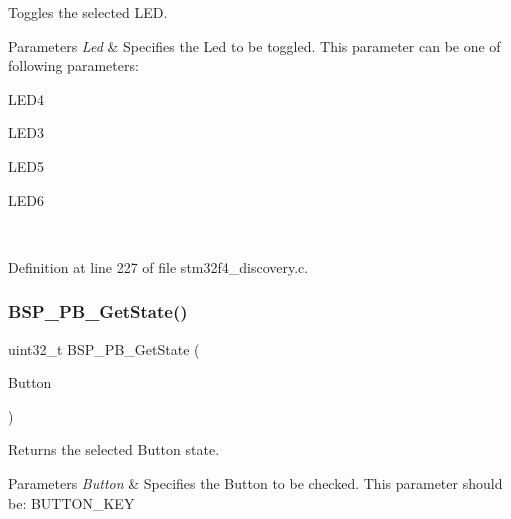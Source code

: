 Toggles the selected L\+ED. 


\begin{DoxyParams}{Parameters}
{\em Led} & Specifies the Led to be toggled. This parameter can be one of following parameters\+: \begin{DoxyItemize}
\item L\+E\+D4 \item L\+E\+D3 \item L\+E\+D5 \item L\+E\+D6 \end{DoxyItemize}
\\
\hline
\end{DoxyParams}


Definition at line 227 of file stm32f4\+\_\+discovery.\+c.

\mbox{\label{group___s_t_m32_f4___d_i_s_c_o_v_e_r_y___l_o_w___l_e_v_e_l___exported___functions_ga8f0978b6cffda9c67266ddfdb3a0abf7}} 
\subsubsection{\texorpdfstring{B\+S\+P\+\_\+\+P\+B\+\_\+\+Get\+State()}{BSP\_PB\_GetState()}}
{\footnotesize\ttfamily uint32\+\_\+t B\+S\+P\+\_\+\+P\+B\+\_\+\+Get\+State (\begin{DoxyParamCaption}\item[{Button\+\_\+\+Type\+Def}]{Button }\end{DoxyParamCaption})}



Returns the selected Button state. 


\begin{DoxyParams}{Parameters}
{\em Button} & Specifies the Button to be checked. This parameter should be\+: B\+U\+T\+T\+O\+N\+\_\+\+K\+EY ~\newline
\\
\hline
\end{DoxyParams}

